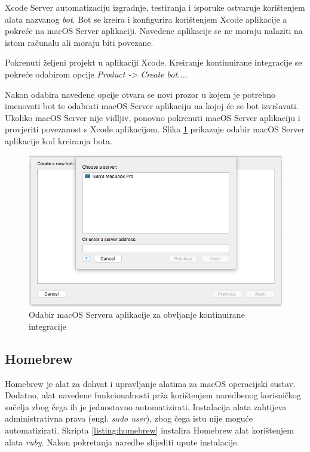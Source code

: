 \documentclass[times, utf8, diplomski, numeric]{fer}
\newcommand{\eng}[1]{(engl. \textit{#1})}
\begin{document}
Xcode Server automatizaciju izgradnje, testiranja i isporuke ostvaruje korištenjem alata nazvanog \textit{bot}. Bot se kreira i konfigurira korištenjem Xcode aplikacije a pokreće na macOS Server aplikaciji. Navedene aplikacije se ne moraju nalaziti na istom računalu ali moraju biti povezane.

Pokrenuti željeni projekt u aplikaciji Xcode. Kreiranje kontinuirane integracije se pokreće odabirom opcije \textit{Product -> Create bot...}.

Nakon odabira navedene opcije otvara se novi prozor u kojem je potrebno imenovati bot te odabrati macOS Server aplikaciju na kojoj će se bot izvršavati. Ukoliko macOS Server nije vidljiv, ponovno pokrenuti macOS Server aplikaciju i provjeriti povezanost s Xcode aplikacijom. Slika \ref{fig:BotServerSelection} prikazuje odabir macOS Server aplikacije kod kreiranja bota.

\begin{figure}
\centering
\includegraphics[scale=0.4]{BotServerSelection}
\caption{Odabir macOS Servera aplikacije za obvljanje kontinuirane integracije}
\label{fig:BotServerSelection}
\end{figure}

\subsection{Homebrew}

Homebrew je alat za dohvat i upravljanje alatima za macOS operacijski sustav\citep{homebrew}. Dodatno, alat navedene funkcionalnosti prža korištenjem naredbenog korisničkog sučelja zbog čega ih je jednostavno automatizirati. Instalacija alata zahtijeva administrativna prava \eng{sudo user}, zbog čega istu nije moguće automatizirati. Skripta \ref{listing:homebrew} instalira Homebrew alat korištenjem alata \textit{ruby}. Nakon pokretanja naredbe slijediti upute instalacije.
\end{document}
